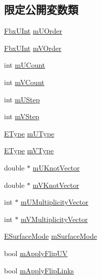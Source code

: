\subsection*{限定公開変数類}
\begin{DoxyCompactItemize}
\item 
\hyperlink{fbxtypes_8h_ae9fb141d8158a730aa85ec5ff2ea3f6b}{Fbx\+U\+Int} \hyperlink{class_fbx_nurbs_a0cb4fa6c97036906cc3ce7d1e6b6d09c}{m\+U\+Order}
\item 
\hyperlink{fbxtypes_8h_ae9fb141d8158a730aa85ec5ff2ea3f6b}{Fbx\+U\+Int} \hyperlink{class_fbx_nurbs_a5e4a956f463a54a8c5b966f0799280c5}{m\+V\+Order}
\item 
int \hyperlink{class_fbx_nurbs_aa8a85cd84b37efadfa8e0f10e97310a0}{m\+U\+Count}
\item 
int \hyperlink{class_fbx_nurbs_ab58fe4ae308396034fd197cbd4982c22}{m\+V\+Count}
\item 
int \hyperlink{class_fbx_nurbs_a6153a67656206737889e0a80a838653e}{m\+U\+Step}
\item 
int \hyperlink{class_fbx_nurbs_a209ec06ea941b6dea3f68d85b3461d21}{m\+V\+Step}
\item 
\hyperlink{class_fbx_nurbs_a16d9562676c9d3511503551790c55643}{E\+Type} \hyperlink{class_fbx_nurbs_a2af23d4c207444f0999651135c118e5c}{m\+U\+Type}
\item 
\hyperlink{class_fbx_nurbs_a16d9562676c9d3511503551790c55643}{E\+Type} \hyperlink{class_fbx_nurbs_ad973e3ca7ca7a3d6d3be94e46153a55b}{m\+V\+Type}
\item 
double $\ast$ \hyperlink{class_fbx_nurbs_a3247102a0eec294db52c9b1846d654c6}{m\+U\+Knot\+Vector}
\item 
double $\ast$ \hyperlink{class_fbx_nurbs_ab825dd3874f212d1f2761656cb9c3beb}{m\+V\+Knot\+Vector}
\item 
int $\ast$ \hyperlink{class_fbx_nurbs_acbd2ab32dc83c8d1292bc21ae251c81d}{m\+U\+Multiplicity\+Vector}
\item 
int $\ast$ \hyperlink{class_fbx_nurbs_adfd469d31dde3a8bedb17daaa6c0f38d}{m\+V\+Multiplicity\+Vector}
\item 
\hyperlink{class_fbx_geometry_adb9d2e34481a2cb40f1d783c665794db}{E\+Surface\+Mode} \hyperlink{class_fbx_nurbs_a50d464f76ef73674c6aca642f87d3134}{m\+Surface\+Mode}
\item 
bool \hyperlink{class_fbx_nurbs_aa25c7dc83aab7ce486927e5d247fbc50}{m\+Apply\+Flip\+UV}
\item 
bool \hyperlink{class_fbx_nurbs_a5776808fc0329e7634bd88eb5b1c5db0}{m\+Apply\+Flip\+Links}
\end{DoxyCompactItemize}

